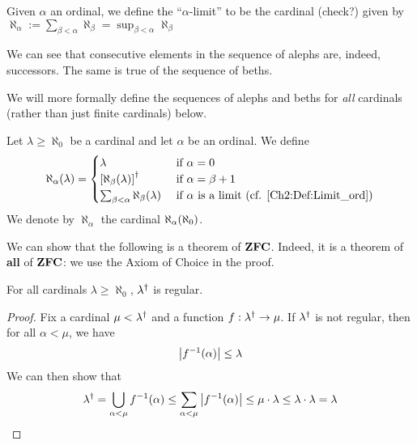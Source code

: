 \begin{boxdefinition}\label{Ch2:Def:Limit_ord}
   Given $\alpha$ an ordinal, we define the ``$\alpha$-limit'' to be the cardinal (\sorry check?) given by $\aleph_{\alpha}:=\sum_{\beta<\alpha}\aleph_{\beta}=\sup_{\beta<\alpha}\aleph_{\beta}$
\end{boxdefinition}

We can see that consecutive elements in the sequence of alephs are, indeed, successors. The same is true of the sequence of beths.

We will more formally define the sequences of alephs and beths for \textit{all} cardinals (rather than just finite cardinals) below.

\begin{boxdefinition}
    Let $\lambda \geq \aleph_0$ be a cardinal and let $\alpha$ be an ordinal. We define
    \begin{align*}
        \aleph_{\alpha}\of{\lambda}
        =
        \begin{cases}
            \lambda & \text{ if } \alpha = 0 \\
            \brac{\aleph_{\beta}\of{\lambda}}\dg & \text{ if } \alpha = \beta + 1 \\
            \sum_{\beta < \alpha} \aleph_{\beta}\of{\lambda} & \text{ if } \alpha \text{ is a limit (cf. \Cref{Ch2:Def:Limit_ord})}
        \end{cases}
    \end{align*}
    We denote by $\aleph_{\alpha}$ the cardinal $\aleph_{\alpha}\!\left( \aleph_{0} \right)$.
\end{boxdefinition}

We can show that the following is a theorem of $\mathbf{ZFC}$. Indeed, it is a theorem of \textbf{all} of $\mathbf{ZFC}$: we use the Axiom of Choice in the proof.

\begin{boxproposition}
    For all cardinals $\lambda \geq \aleph_0$, $\lambda^{\dagger}$ is regular.
\end{boxproposition}
\begin{proof}
    Fix a cardinal $\mu < \lambda^{\dagger}$ and a function $f : \lambda^{\dagger} \to \mu$. If $\lambda^{\dagger}$ is not regular, then for all $\alpha < \mu$, we have
    \begin{align*}
        \left\lvert f^{-1}(\alpha) \right\rvert \leq \lambda
    \end{align*}
    We can then show that
    \begin{align*}
        \lambda^{\dagger} = \bigcup_{\alpha < \mu} f^{-1}(\alpha)
        \leq \sum_{\alpha < \mu} \left\lvert f^{-1}(\alpha) \right\rvert \leq \mu \cdot \lambda \leq \lambda \cdot \lambda = \lambda
    \end{align*}
\end{proof}

